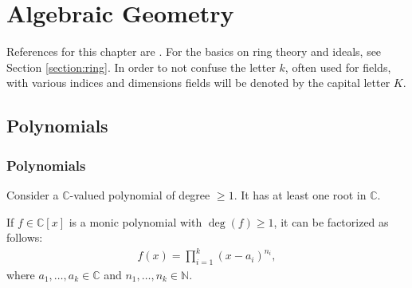 \chapter{Algebraic Geometry}\label{chapter:alggeom}

    References for this chapter are \cite{gathmann, redbook}. For the basics on ring theory and ideals, see Section \ref{section:ring}. In order to not confuse the letter $k$, often used for fields, with various indices and dimensions fields will be denoted by the capital letter $K$.

\section{Polynomials}
\subsection{Polynomials}



    \begin{theorem}\label{alggeom:fundamental_theorem_of_algebra}
        Consider a $\mathbb{C}$-valued polynomial of degree $\geq 1$. It has at least one root in $\mathbb{C}$.
    \end{theorem}
    \begin{result}
        If $f\in \mathbb{C}[x]$ is a monic polynomial with $\deg(f)\geq1$, it can be factorized as follows:
        \begin{gather*}
            f(x) = \prod_{i=1}^k(x-a_i)^{n_i},
        \end{gather*}
        where $a_1,\ldots, a_k\in\mathbb{C}$ and $n_1,\ldots,n_k\in\mathbb{N}$.
    \end{result}

